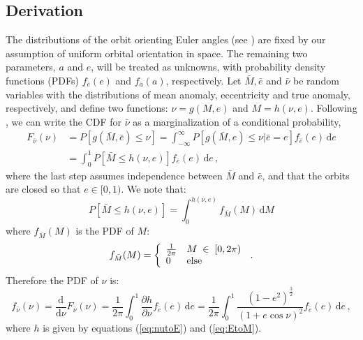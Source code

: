 \subsection{Derivation}\label{sec:analytic_dists_deriv}
The distributions of the orbit orienting Euler angles (see ) are fixed by our assumption of uniform orbital orientation in space.  The remaining two parameters, $a$ and $e$, will be treated as unknowns, with probability density functions (PDFs) $f_{\bar{e}}(e)$ and $f_{\bar{a}}(a)$, respectively. Let $\bar{M}, \bar{e}$ and $\bar{\nu}$ be random variables with the distributions of mean anomaly, eccentricity and true anomaly, respectively, and define two functions: $\nu = g(M,e)$ and $M = h(\nu,e)$.  Following \citet{larson}, we can write the CDF for $\bar{\nu}$ as a marginalization of a conditional probability,
\begin{align} 
F_{\bar{\nu}}(\nu) &= P\left[g(\bar{M},\bar{e}) \le \nu\right] = \int_{-\infty}^{\infty} P\left[g(\bar{M},e) \le \nu | \bar{e} = e\right]f_{\bar{e}}(e)\, \mathrm{d}e\nonumber\\
&=  \int_{0}^{1} P\left[\bar{M} \le h(\nu,e)\right]f_{\bar{e}}(e)\, \mathrm{d}e\,,
\end{align}
where the last step assumes independence between  $\bar{M}$ and $\bar{e}$, and that the orbits are closed so that $e \in [0,1)$.  We note that:
\begin{equation}\label{eq:Mprob}
P[\bar{M} \le h(\nu,e)] = \int_0^{h(\nu,e)} f_{\bar{M}}(M)\, \mathrm{d}M
\end{equation}
where $f_{\bar{M}}(M)$ is the PDF of $M$:
\begin{equation}\label{eq:Mdist}
f_{\bar M}(M) = \left\{
    \begin{array}{l l}
    \frac{1}{2 \pi} & M \; \in \; [0, 2\pi) \\
    0 & \mathrm{else}
    \end{array} \right. \,.
\end{equation}
Therefore the PDF of $\nu$ is:
\begin{equation}\label{eq:nupdf}
f_{\bar{\nu}}(\nu) =  \frac{\mathrm{d}}{\mathrm{d}\nu}F_{\bar{\nu}}(\nu) =  \frac{1}{2\pi} \int_{0}^{1} \frac{\partial h}{\partial \nu}f_{\bar{e}}(e)\, \mathrm{d}e  =  \frac{1}{2\pi} \int_{0}^{1} \frac{\left(1-e^2\right)^\frac{3}{2}}{\left(1+e\cos\nu\right)^2} f_{\bar{e}}(e)\, \mathrm{d}e \, ,
\end{equation}
where $h$ is given by equations (\ref{eq:nutoE}) and (\ref{eq:EtoM}).

